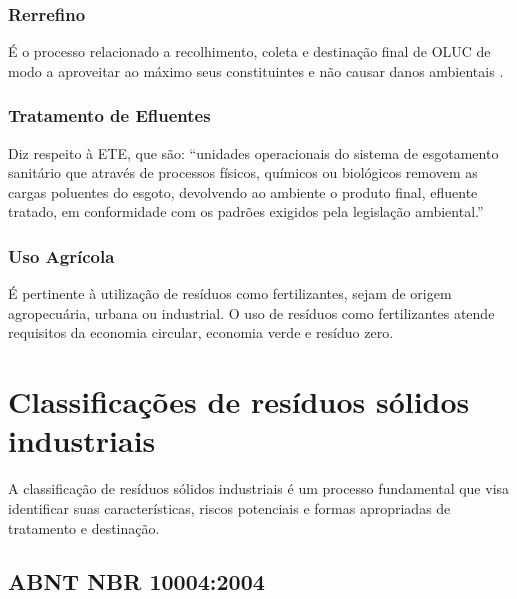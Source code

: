 \subsubsection{Rerrefino} 

É o processo relacionado a recolhimento, coleta e destinação final de \gls{OLUC} de modo a aproveitar ao máximo seus constituintes e não causar danos ambientais \cite{diagnostico_cristine}.

\subsubsection{Tratamento de Efluentes}

Diz respeito à \gls{ETE}, que são: “unidades operacionais do sistema de esgotamento sanitário que através de processos físicos, químicos ou biológicos removem as cargas poluentes do esgoto, devolvendo ao ambiente o produto final,  efluente tratado, em conformidade com os padrões exigidos pela legislação ambiental.” \parencite{casan_ete_2023}

\subsubsection{Uso Agrícola}

É pertinente à utilização de resíduos como fertilizantes, sejam de origem agropecuária, urbana ou industrial. O uso de resíduos como fertilizantes atende requisitos da economia circular, economia verde e resíduo zero. \cite{diagnostico_cristine}


\section{Classificações de resíduos sólidos industriais}

A classificação de resíduos sólidos industriais é um processo fundamental que visa identificar suas características, riscos potenciais e formas apropriadas de tratamento e destinação. 

\subsection{ABNT NBR 10004:2004}

